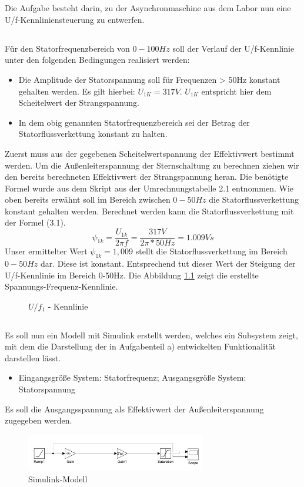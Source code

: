\chapter{}
Die Aufgabe besteht darin, zu der Asynchronmaschine aus dem Labor nun eine U/f-Kennliniensteuerung zu entwerfen.
\section{}
Für den Statorfrequenzbereich von $ 0-100Hz $ soll der Verlauf der U/f-Kennlinie unter den folgenden Bedingungen realisiert werden:
\begin{itemize}
	\item Die Amplitude der Statorspannung soll für Frequenzen > 50Hz konstant gehalten werden. Es gilt hierbei: $ U_{1K} = 317V $. $ U_{1K} $ entspricht hier dem Scheitelwert der Strangspannung.
	\item In dem obig genannten Statorfrequenzbereich sei der Betrag der Statorflussverkettung konstant zu halten.
\end{itemize}

Zuerst muss aus der gegebenen Scheitelwertspannung der Effektivwert bestimmt werden. Um die Außenleiterspannung der Sternschaltung zu berechnen ziehen wir den bereits berechneten Effektivwert der Strangspannung heran. Die benötigte Formel wurde aus dem Skript aus der Umrechnungstabelle 2.1 entnommen. Wie oben bereits erwähnt soll im Bereich zwischen $ 0-50Hz $ die Statorflussverkettung konstant gehalten werden. Berechnet werden kann die Statorflussverkettung mit der Formel (3.1). 
\begin{equation}
	\psi_{1k} = \frac{U_{1k}}{2\pi f} = \frac{317V}{2\pi*50Hz} = 1.009Vs
\end{equation}
Unser ermittelter Wert $ \psi_{1k}=1,009 $ stellt die Statorflussverkettung im Bereich $ 0-50Hz $ dar. Diese ist konstant. Entsprechend tut dieser Wert der Steigung der U/f-Kennlinie im Bereich 0-50Hz. Die Abbildung \ref{fig:3:UF} zeigt die erstellte Spannungs-Frequenz-Kennlinie.

\begin{figure}[h]
	\centering
	
	\caption{$ U/f_{1} $ - Kennlinie}
	\label{fig:3:UF}
\end{figure}

\section{}
Es soll nun ein Modell mit Simulink erstellt werden, welches ein Subsystem zeigt, mit dem die Darstellung der in Aufgabenteil a) entwickelten Funktionalität darstellen lässt.
\begin{itemize}
	\item Eingangsgröße System: Statorfrequenz; Ausgangsgröße System: Statorspannung
\end{itemize}
Es soll die Ausgangsspannung als Effektivwert der Außenleiterspannung zugegeben werden.

\begin{figure}[h]
	\centering
	\includegraphics[width=0.7\textwidth]{./Bilder/Simulink-Modell.pdf}
	\caption{Simulink-Modell}
	\label{fig:3:simulink}
\end{figure}